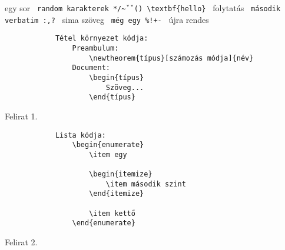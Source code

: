 \documentclass{article}
\begin{document}
    egy sor \verb | random karakterek */~ˇˇ() \textbf{hello} | folytatás \verb | második verbatim :,? | sima szöveg \verb | még egy %
    
    \clearpage

    \lipsum[1]
    
    \begin{forraskod}
        \begin{verbatim}
            Tétel környezet kódja:
                Preambulum:
                    \newtheorem{típus}[számozás módja]{név}
                Document:
                    \begin{típus}
                        Szöveg...
                    \end{típus}
        \end{verbatim}
        \caption{Felirat 1.}
    \end{forraskod}
    
    \lipsum[2-3]
    
    \begin{forraskod}
        \begin{verbatim}
            Lista kódja:
                \begin{enumerate}
                    \item egy
                    
                    \begin{itemize}
                        \item második szint
                    \end{itemize}
                    
                    \item kettő
                \end{enumerate}
        \end{verbatim}
        \caption{Felirat 2.}
    \end{forraskod}
    
\end{document}
